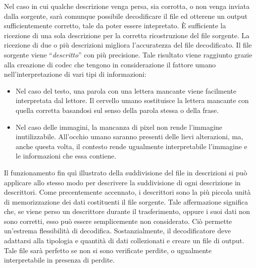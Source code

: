 Nel caso in cui qualche descrizione venga persa, sia corrotta, o non venga inviata dalla sorgente, sarà comunque possibile decodificare il file ed otterene un output sufficientemente corretto, tale da poter essere intepretato. \`E sufficiente la ricezione di una sola descrizione per la corretta ricostruzione del file sorgente. La ricezione di due o pi\`u descrizioni migliora l'accuratezza del file decodificato. Il file sorgente viene ``\emph{descritto}'' con pi\`u precisione.  Tale risultato viene raggiunto grazie alla creazione di codec che tengono in considerazione il fattore umano nell'interpretazione di vari tipi di informazioni:
\begin{itemize}
 \item Nel caso del testo, una parola con una lettera mancante viene facilmente interpretata dal lettore. Il cervello umano sostituisce la lettera mancante con quella corretta basandosi sul senso della parola stessa o della frase.
 \item Nel caso delle immagini, la mancanza di pixel non rende l'immagine inutilizzabile. All'occhio umano saranno presenti delle lievi alterazioni, ma, anche questa volta, il contesto rende ugualmente interpretabile l'immagine e le informazioni che essa contiene.
\end{itemize}
Il funzionamento fin qu\`i illustrato della suddivisione del file in descrizioni si pu\`o applicare allo stesso modo per descrivere la suddivisione di ogni descrizione in descrittori. Come precentemente accennato, i descrittori sono la pi\`u piccola unit\`a di memorizzazione dei dati costituenti il file sorgente. Tale affermazione significa che, se viene perso un descrittore durante il trasferimento, oppure i suoi dati non sono corretti, esso può essere semplicemente non considerato. Ci\`o permette un'estrema flessibilit\`a di decodifica. Sostanzialmente, il decodificatore deve adattarsi alla tipologia e quantit\`a di dati collezionati e creare un file di output. Tale file sar\`a perfetto se non si sono verificate perdite, o ugualmente interpretabile in presenza di perdite.

